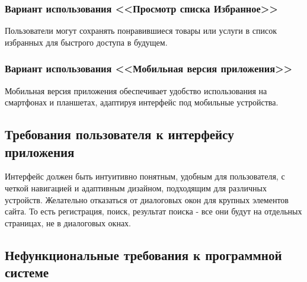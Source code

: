 \subsubsection{Вариант использования <<Просмотр списка Избранное>>}
Пользователи могут сохранять понравившиеся товары или услуги в список избранных для быстрого доступа в будущем.

\subsubsection{Вариант использования <<Мобильная версия приложения>>}
Мобильная версия приложения обеспечивает удобство использования на смартфонах и планшетах, адаптируя интерфейс под мобильные устройства.


\subsection{Требования пользователя к интерфейсу приложения}
Интерфейс должен быть интуитивно понятным, удобным для пользователя, с четкой навигацией и адаптивным дизайном, подходящим для различных устройств. Желательно отказаться от диалоговых окон для крупных элементов сайта. То есть регистрация, поиск, результат поиска - все они будут на отдельных страницах, не в диалоговых окнах.
\subsection{Нефункциональные требования к программной системе}


